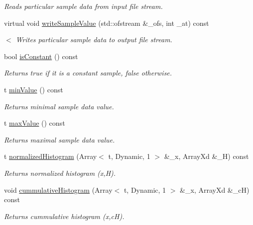 \begin{DoxyCompactItemize}
\begin{DoxyCompactList}\small\item\em Reads particular sample data from input file stream. \end{DoxyCompactList}\item 
virtual void \hyperlink{class_t_sample_abb2feebe92f8fdb290046d6ef0573507}{write\-Sample\-Value} (std\-::ofstream \&\-\_\-ofs, int \-\_\-at) const 
\begin{DoxyCompactList}\small\item\em $<$ Writes particular sample data to output file stream. \end{DoxyCompactList}\item 
bool \hyperlink{class_t_sample_a947fe85c93d77a82e6d975656490b4f4}{is\-Constant} () const 
\begin{DoxyCompactList}\small\item\em Returns true if it is a constant sample, false otherwise. \end{DoxyCompactList}\item 
t \hyperlink{class_t_sample_a8390ad552199323ae9cc6ab9b17486c6}{min\-Value} () const 
\begin{DoxyCompactList}\small\item\em Returns minimal sample data value. \end{DoxyCompactList}\item 
t \hyperlink{class_t_sample_aac5e27142c09df0a3213a702a5db2a46}{max\-Value} () const 
\begin{DoxyCompactList}\small\item\em Returns maximal sample data value. \end{DoxyCompactList}\item 
t \hyperlink{class_t_sample_afe235e9274b04a9b62d329edf9525bb3}{normalized\-Histogram} (Array$<$ t, Dynamic, 1 $>$ \&\-\_\-x, Array\-Xd \&\-\_\-\-H) const 
\begin{DoxyCompactList}\small\item\em Returns normalized histogram (x,H). \end{DoxyCompactList}\item 
void \hyperlink{class_t_sample_a6190e19f26c7135cc03b31f3aa23d154}{cummulative\-Histogram} (Array$<$ t, Dynamic, 1 $>$ \&\-\_\-x, Array\-Xd \&\-\_\-c\-H) const 
\begin{DoxyCompactList}\small\item\em Returns cummulative histogram (x,c\-H). \end{DoxyCompactList}\item 

\end{DoxyCompactItemize}

